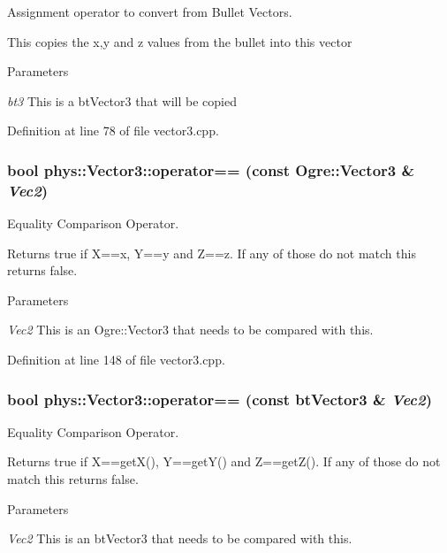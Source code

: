 Assignment operator to convert from Bullet Vectors. 

This copies the x,y and z values from the bullet into this vector 
\begin{DoxyParams}{Parameters}
\item[{\em bt3}]This is a btVector3 that will be copied \end{DoxyParams}


Definition at line 78 of file vector3.cpp.

\hypertarget{classphys_1_1Vector3_aef82f53ef74363d7b662cbd1d3c204db}{
\subsubsection[{operator==}]{\setlength{\rightskip}{0pt plus 5cm}bool phys::Vector3::operator== (const Ogre::Vector3 \& {\em Vec2})}}
\label{d5/d6a/classphys_1_1Vector3_aef82f53ef74363d7b662cbd1d3c204db}


Equality Comparison Operator. 

Returns true if X==x, Y==y and Z==z. If any of those do not match this returns false. 
\begin{DoxyParams}{Parameters}
\item[{\em Vec2}]This is an Ogre::Vector3 that needs to be compared with this. \end{DoxyParams}


Definition at line 148 of file vector3.cpp.

\hypertarget{classphys_1_1Vector3_a1146d1b1b0f3d8809edfbd24e79b724a}{
\subsubsection[{operator==}]{\setlength{\rightskip}{0pt plus 5cm}bool phys::Vector3::operator== (const btVector3 \& {\em Vec2})}}
\label{d5/d6a/classphys_1_1Vector3_a1146d1b1b0f3d8809edfbd24e79b724a}


Equality Comparison Operator. 

Returns true if X==getX(), Y==getY() and Z==getZ(). If any of those do not match this returns false. 
\begin{DoxyParams}{Parameters}
\item[{\em Vec2}]This is an btVector3 that needs to be compared with this. \end{DoxyParams}


